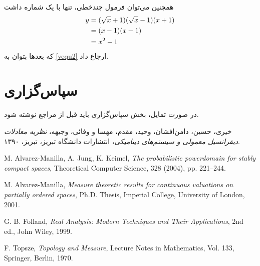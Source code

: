 \documentclass[aimcpersian]{aimc46}
\begin{document}
همچنین می‌توان فرمول چندخطی، تنها با یک شماره داشت
\begin{align}
y&=(\sqrt{x}+1)(\sqrt{x}-1)(x+1)\notag\\
&=(x-1)(x+1)\label{vequ2}\\
&=x^2 -1\notag
\end{align}
که بعدها بتوان به \eqref{vequ2} ارجاع داد.




\section*{سپاس‌گزاری}
در صورت تمایل، بخش سپاس‌گزاری باید قبل از مراجع نوشته شود.



\begin{thebibliography}{9}
خیری، حسین، دامن‌افشان، وحید، مقدم، مهسا و وفائی، وجیهه، \textit{نظریه معادلات دیفرانسیل معمولی و سیستم‌های دینامیکی}،
انتشارات دانشگاه تبریز، تبریز، ۱۳۹۰.
\begin{LTRbibitems}
\resetlatinfont
{}
M. Alvarez-Manilla, A. Jung, K. Keimel, \textit{The probabilistic powerdomain for stably compact
spaces}, Theoretical Computer Science, 328 (2004), pp. 221--244.

M. Alvarez-Manilla, \textit{Measure theoretic results for continuous valuations on partially ordered spaces}, Ph.D. Thesis, Imperial College, University of London, 2001.

G. B. Folland, \textit{Real Analysis: Modern Techniques and Their Applications}, 2nd ed., John Wiley, 1999.

F. Topsze, \textit{Topology and Measure}, Lecture Notes in Mathematics, Vol. 133, Springer, Berlin, 1970.
\end{LTRbibitems}
\end{thebibliography}

\end{document}
